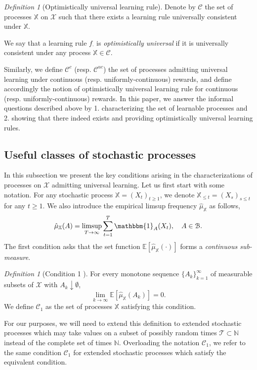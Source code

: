 \documentclass[aos]{imsart}
\theoremstyle{plain}
\theoremstyle{remark}
\newtheorem{definition}[theorem]{Definition}
\newcommand{\Bcal}{\mathcal{B}}
\newcommand{\Ccal}{\mathcal{C}}
\newcommand{\Tcal}{\mathcal{T}}
\newcommand{\Xcal}{\mathcal{X}}
\newcommand{\Ebb}{\mathbb{E}}
\newcommand{\Nbb}{\mathbb{N}}
\newcommand{\Xbb}{\mathbb{X}}
\newcommand{\1}{\mathbbm{1}}%
\newcommand{\X}{\mathcal X}
\newcommand{\E}{\mathbb E}
\renewcommand{\limsup}{\mathop{\rm limsup}}
\newcommand{\ProcX}{\mathbb{X}}
\begin{document}
\begin{definition}[Optimistically universal learning rule]
    Denote by $\Ccal $ the set of processes $\Xbb$ on $\Xcal$ such that there exists a learning rule universally consistent under $\Xbb$.
    
    We say that a learning rule $f_\cdot$ is \emph{optimistically universal} if it is universally consistent under any process $\Xbb\in\Ccal $.
\end{definition}
Similarly, we define $\Ccal^c$ (resp. $\Ccal^{uc}$) the set of processes admitting universal learning under continuous (resp. uniformly-continuous) rewards, and define accordingly the notion of optimistically universal learning rule for continuous (resp. uniformly-continuous) rewards. In this paper, we answer the informal questions described above by 1. characterizing the set of learnable processes and 2. showing that there indeed exists and providing optimistically universal learning rules.

\subsection{Useful classes of stochastic processes}

In this subsection we present the key conditions arising in the characterizations of processes on $\Xcal$ admitting universal learning. Let us first start with some notation. For any stochastic process $\Xbb=(X_t)_{t\geq 1}$, we denote $\Xbb_{\leq t} = (X_s)_{s\leq t}$ for any $t\geq 1$. We also introduce the empirical limsup frequency $\hat\mu_{\Xbb}$ as follows,
\begin{equation*}
    \hat\mu_{\Xbb}(A) = \limsup_{T\to\infty} \sum_{t=1}^T \1_A(X_t),\quad A\in\Bcal.
\end{equation*}
The first condition asks that the set function $\Ebb[\hat\mu_\Xbb(\cdot)]$ forms a \emph{continuous sub-measure}.

\begin{definition}[Condition 1 \citep*{hanneke:21}]
  \label{con:kc}
  For every monotone sequence $\{A_k\}_{k=1}^{\infty}$ of measurable subsets of $\X$ with $A_k \downarrow \emptyset$,
  \begin{equation*}
    \lim\limits_{k \to \infty} \E\!\left[ \hat{\mu}_{\ProcX}(A_k) \right] = 0.
  \end{equation*}
  We define $\Ccal_1$ as the set of processes $\Xbb$ satisfying this condition.
\end{definition}

For our purposes, we will need to extend this definition to extended stochastic processes which may take values on a subset of possibly random times $\Tcal\subset \Nbb$ instead of the complete set of times $\Nbb$. Overloading the notation $\Ccal_1$, we refer to the same condition $\Ccal_1$ for extended stochastic processes which satisfy the equivalent condition.
\end{document}

